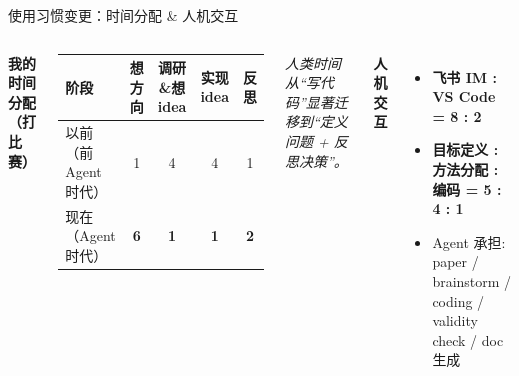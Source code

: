 \documentclass[aspectratio=169,11pt]{beamer}
\newcommand{\hl}[1]{\textcolor{lblue}{\textbf{#1}}}
\newcommand{\rhl}[1]{\textcolor{accred}{\textbf{#1}}}
\begin{document}
\begin{frame}{使用习惯变更：时间分配 \& 人机交互}
  \vspace{2pt}
  \begin{columns}[T,onlytextwidth]
    \textbf{\color{icmlblue}我的时间分配（打比赛）}\\[6pt]
    \begin{center}
      \footnotesize
      \setlength{\tabcolsep}{4pt}\renewcommand{\arraystretch}{1.25}
      \begin{tabular}{@{}lcccc@{}}
        \toprule
        阶段 & 想方向 & 调研\&想 idea & 实现 idea & 反思 \\
        \midrule
        以前（前 Agent 时代） & 1 & 4 & 4 & 1 \\
        现在（Agent 时代） & \rhl{6} & \hl{1} & \hl{1} & \rhl{2} \\
        \bottomrule
      \end{tabular}
    \end{center}
    \vspace{4pt}
    {\scriptsize\itshape 人类时间从``写代码''显著迁移到``定义问题 + 反思决策''。}

    \textbf{\color{icmlblue}人机交互}
    \begin{itemize}\setlength{\itemsep}{6pt}
      \item {\footnotesize \hl{飞书 IM : VS Code = 8 : 2}}
      \item {\footnotesize \hl{目标定义 : 方法分配 : 编码 = 5 : 4 : 1}}
      \item {\footnotesize Agent 承担:\,paper / brainstorm / coding / validity check / doc 生成}
    \end{itemize}
  \end{columns}
\end{frame}
\end{document}
